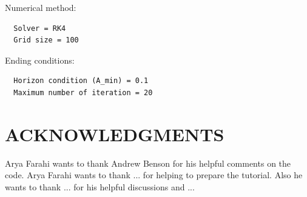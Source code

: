 \documentclass[12pt]{article}
\begin{document}
Numerical method:
\begin{verbatim}
  Solver = RK4
  Grid size = 100
\end{verbatim}

Ending conditions:
\begin{verbatim}
  Horizon condition (A_min) = 0.1
  Maximum number of iteration = 20
\end{verbatim}


\section*{ACKNOWLEDGMENTS}
 Arya Farahi wants to thank Andrew Benson for his helpful comments on the code. Arya Farahi wants to thank ... for helping to prepare the tutorial. Also he wants to thank ... for his helpful discussions and ...

 
\end{document}
